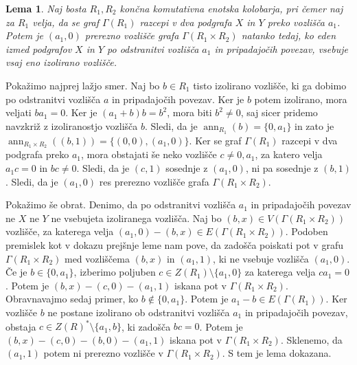 \documentclass[a4paper, 12pt]{amsart}
\theoremstyle{definition} %
\theoremstyle{plain} %
\newtheorem{lema}[definicija]{Lema}
\DeclareMathOperator{\ann}{ann}
\begin{document}
\begin{lema}
Naj bosta $R_1, R_2$ končna komutativna enotska kolobarja, pri čemer naj za $R_1$ velja, da se graf $\Gamma(R_1)$ razcepi v dva podgrafa $X$ in $Y$ preko vozlišča $a_1$. Potem je $(a_1,0) $ prerezno vozlišče grafa $\Gamma(R_1 \times R_2)$ natanko tedaj, ko eden izmed podgrafov $X$ in $Y$ po odstranitvi vozlišča $a_1$ in pripadajočih povezav, vsebuje vsaj eno izolirano vozlišče.
\end{lema}

\proof
Pokažimo najprej lažjo smer. Naj bo $b\in R_1$ tisto izolirano vozlišče, ki ga dobimo po odstranitvi vozlišča $a$ in pripadajočih povezav. Ker je $b$ potem izolirano, mora veljati $ba_1 = 0$. Ker je $(a_1 + b)b = b^2$, mora biti $b^2\neq 0$, saj sicer pridemo navzkriž z izoliranostjo vozlišča $b$. Sledi, da je $\ann_{R_1}(b) = \{0,a_1\}$ in zato je $\ann_{R_1\times R_2}((b,1)) = \{(0,0),(a_1,0)\}$. Ker se graf $\Gamma(R_1)$ razcepi v dva podgrafa preko $a_1$, mora obstajati še neko vozlišče $c\neq 0,a_1$, za katero velja $a_1 c = 0$ in $bc\neq 0$. Sledi, da je $(c,1)$ sosednje z $(a_1,0)$, ni pa sosednje z $(b,1)$. Sledi, da je $(a_1,0)$ res prerezno vozlišče grafa $\Gamma(R_1 \times R_2)$.

Pokažimo še obrat. Denimo, da po odstranitvi vozlišča $a_1$ in pripadajočih povezav ne $X$ ne $Y$ ne vsebujeta izoliranega vozlišča. Naj bo $(b,x)\in V(\Gamma(R_1\times R_2))$ vozlišče, za katerega velja $(a_1,0) -(b,x) \in E(\Gamma(R_1\times R_2))$. Podoben premislek kot v dokazu prejšnje leme nam pove, da zadošča poiskati pot  v grafu $\Gamma(R_1 \times R_2)$ med vozliščema $(b,x)$ in $(a_1,1)$, ki ne vsebuje vozlišča $(a_1,0)$. Če je $b\in \{0,a_1\}$, izberimo poljuben $c\in Z(R_1) \setminus \{a_1,0\}$ za katerega velja $ca_1 = 0$. Potem je $(b,x) - (c,0) - (a_1,1)$ iskana pot v $\Gamma(R_1 \times R_2)$. Obravnavajmo sedaj primer, ko $b\notin \{0,a_1\}$. Potem je $a_1 -b\in E(\Gamma(R_1))$. Ker vozlišče $b$ ne postane izolirano ob odstranitvi vozlišča $a_1$ in pripadajočih povezav, obstaja $c\in Z(R)^*\setminus\{a_1,b\}$, ki zadošča $bc=0$. Potem je $(b,x)-(c,0)-(b,0)-(a_1,1)$ iskana pot v $\Gamma(R_1\times R_2)$. Sklenemo, da $(a_1,1)$ potem ni prerezno vozlišče v $\Gamma(R_1 \times R_2)$. S tem je lema dokazana. 
\endproof
\end{document}
